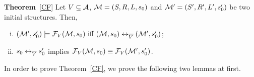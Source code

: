 \documentclass{article}
\begin{document}


 \noindent\textbf{Theorem}~\ref{CF}
 Let $V\subseteq {\cal A}$, ${\cal M}=(S,R,L,s_0)$ and ${\cal M}'=(S',R', L',s_0')$ be two initial structures. Then,
 \begin{enumerate}[(i)]
 \item  $({\cal M}',s_0') \models {\cal F}_V({\cal M},s_0)
 \text{ iff } ({\cal M},s_0) \leftrightarrow_{\overline V} ({\cal M}',s_0')$;

 \item  $s_0 \leftrightarrow_{\overline V} s_0'$ implies  ${\cal F}_V({\cal M}, s_0) \equiv {\cal F}_V({\cal M}', s_0')$.

 \end{enumerate}

 In order to prove Theorem~\ref{CF}, we prove the following two lemmas at first.
\end{document}
